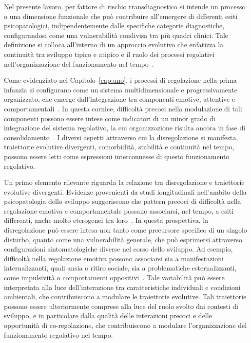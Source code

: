             Nel presente lavoro, per fattore di rischio transdiagnostico si intende un processo o una dimensione funzionale che può contribuire all'emergere di differenti esiti psicopatologici, indipendentemente dalle specifiche categorie diagnostiche, configurandosi come una vulnerabilità condivisa tra più quadri clinici. Tale definizione si colloca all'interno di un approccio evolutivo che enfatizza la continuità tra sviluppo tipico e atipico e il ruolo dei processi regolativi nell'organizzazione del funzionamento nel tempo~\cite{rutter1989,sroufe2009}.

            Come evidenziato nel Capitolo~\ref{cap:uno}, i processi di regolazione nella prima infanzia si configurano come un sistema multidimensionale e progressivamente organizzato, che emerge dall'integrazione tra componenti emotive, attentive e comportamentali~\cite{cole2004,eisenberg2010}. In questa cornice, difficoltà precoci nella modulazione di tali componenti possono essere intese come indicatori di un minor grado di integrazione del sistema regolativo, la cui organizzazione risulta ancora in fase di consolidamento~\cite{cicchetti2009}. I diversi aspetti attraverso cui la disregolazione si manifesta, traiettorie evolutive divergenti, comorbidità, stabilità e continuità nel tempo, possono essere letti come espressioni interconnesse di questo funzionamento regolativo.

            Un primo elemento rilevante riguarda la relazione tra disregolazione e traiettorie evolutive divergenti. Evidenze provenienti da studi longitudinali nell'ambito della psicopatologia dello sviluppo suggeriscono che pattern precoci di difficoltà nella regolazione emotiva e comportamentale possano associarsi, nel tempo, a esiti differenti, anche molto eterogenei tra loro~\cite{cicchetti2009,eisenberg2010,sroufe2009}. In questa prospettiva, la disregolazione può essere intesa non tanto come precursore specifico di un singolo disturbo, quanto come una vulnerabilità generale, che può esprimersi attraverso configurazioni sintomatologiche diverse nel corso dello sviluppo. Ad esempio, difficoltà nella regolazione emotiva possono associarsi sia a manifestazioni internalizzanti, quali ansia o ritiro sociale, sia a problematiche esternalizzanti, come impulsività o comportamenti oppositivi~\cite{beauchaine2019}. Tale variabilità può essere interpretata alla luce dell'interazione tra caratteristiche individuali e condizioni ambientali, che contribuiscono a modulare le traiettorie evolutive. Tali traiettorie possono essere ulteriormente comprese alla luce del ruolo svolto dai contesti di sviluppo, e in particolare dalla qualità delle interazioni precoci e delle opportunità di co-regolazione, che contribuiscono a modulare l'organizzazione del funzionamento regolativo nel tempo.

